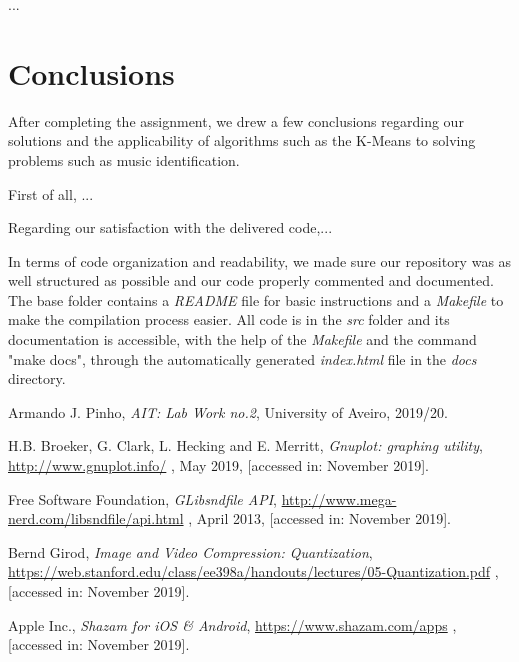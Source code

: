 \documentclass[12pt]{article}
\begin{document}
...

\newpage
\section*{Conclusions}

After completing the assignment, we drew a few conclusions regarding our 
solutions and the applicability of algorithms such as the K-Means to solving
problems such as music identification.

First of all, ...

Regarding our satisfaction with the delivered code,...

In terms of code organization and readability, we made sure our 
repository was as well structured as possible and our code properly commented
and documented.
The base folder contains a {\it README\/} file for basic instructions and a 
{\it Makefile\/} to make the compilation process easier.
All code is in the {\it src\/} folder and its documentation is accessible, 
with the help of the {\it Makefile\/} and the command "make docs", through
the automatically generated {\it index.html\/} file in the {\it docs\/} 
directory.

\begin{thebibliography}{9}
  

    Armando J. Pinho,
    \textit{AIT: Lab Work no.2},
    University of Aveiro,
    2019/20.
  
    H.B. Broeker, G. Clark, L. Hecking and E. Merritt,
    \textit{Gnuplot: graphing utility},
    \url{http://www.gnuplot.info/} ,
    May 2019,
    [accessed in: November 2019].

    Free Software Foundation,
    \textit{GLibsndfile API},
    \url{http://www.mega-nerd.com/libsndfile/api.html} ,
    April 2013,
    [accessed in: November 2019].

    Bernd Girod,
    \textit{Image and Video Compression: Quantization},
    \url{https://web.stanford.edu/class/ee398a/handouts/lectures/05-Quantization.pdf} ,
    [accessed in: November 2019].

    Apple Inc.,
    \textit{Shazam for iOS \& Android},
    \url{https://www.shazam.com/apps} ,
    [accessed in: November 2019].

\end{thebibliography}

\clearpage
\end{document}
